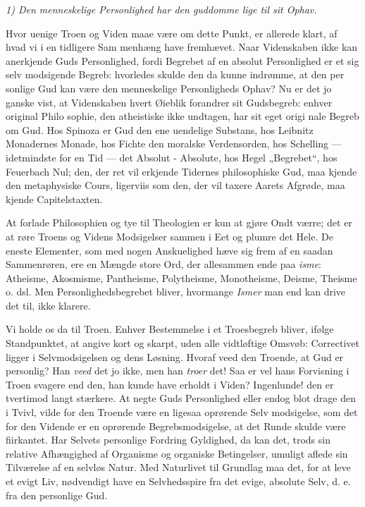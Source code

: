\documentclass[12pt]{book}
\newcommand{\opage}[1]{\marginnote{\footnotesize\textit{[#1]}}}
\begin{document}
\textit{1) Den menneskelige Personlighed har den guddomme\-%
lige til sit Ophav.}

Hvor uenige Troen og Viden maae være om dette
Punkt, er allerede klart, af hvad vi i en tidligere Sam\-%
menhæng have fremhævet. Naar Videnskaben ikke kan
anerkjende Guds Personlighed, fordi Begrebet af en
absolut Personlighed er et sig selv modsigende Begreb:
hvorledes skulde den da kunne indrømme, at den per\-%
\opage{141}\setcounter{footnote}{0}%
sonlige Gud kan være den menneskelige Personligheds
Ophav? Nu er det jo ganske vist, at Videnskaben hvert
Øieblik forandrer sit Gudsbegreb: enhver original Philo\-%
sophie, den atheistiske ikke undtagen, har sit eget origi\-%
nale Begreb om Gud. Hos Spinoza er Gud den ene
uendelige Substans, hos Leibnitz Monadernes Monade,
hos Fichte den moralske Verdensorden, hos Schelling ---
idetmindste for en Tid --- det Absolut - Absolute, hos
Hegel „Begrebet“, hos Feuerbach Nul; den, der ret vil
erkjende Tidernes philosophiske Gud, maa kjende den
metaphysiske Cours, ligerviis som den, der vil taxere
Aarets Afgrøde, maa kjende Capitelstaxten.

At forlade Philosophien og tye til Theologien er kun
at gjøre Ondt værre; det er at røre Troens og Videns
Modsigelser sammen i Eet og plumre det Hele. De
eneste Elementer, som med nogen Anskuelighed hæve
sig frem af en saadan Sammenrøren, ere en Mængde store
Ord, der allesammen ende paa \textit{isme}: Atheisme, Akosmisme,
Pantheisme, Polytheisme, Monotheisme, Deisme, Theisme
o. dsl. Men Personlighedsbegrebet bliver, hvormange \textit{Ismer}
man end kan drive det til, ikke klarere.

Vi holde os da til Troen. Enhver Bestemmelse i et
Troesbegreb bliver, ifølge Standpunktet, at angive kort
og skarpt, uden alle vidtløftige Omsvøb: Correctivet
ligger i Selvmodsigelsen og dens Løsning. Hvoraf veed
den Troende, at Gud er personlig? Han \textit{veed} det jo
ikke, men han \textit{troer} det! Saa er vel hans Forvisning i
Troen svagere end den, han kunde have erholdt i Viden?
Ingenlunde! den er tvertimod langt stærkere. At negte
Guds Personlighed eller endog blot drage den i Tvivl,
vilde for den Troende være en ligesaa oprørende Selv\-%
modsigelse, som det for den Vidende er en oprørende
Begrebsmodsigelse, at det Runde skulde være fiirkantet.
Har Selvets personlige Fordring Gyldighed, da kan det,
\opage{142}\setcounter{footnote}{0}%
trods sin relative Afhængighed af Organisme og organiske
Betingelser, umuligt aflede sin Tilværelse af en selvløs
Natur. Med Naturlivet til Grundlag maa det, for at leve
et evigt Liv, nødvendigt have en Selvhedsspire fra det
evige, absolute Selv, d. e. fra den personlige Gud.
\end{document}

